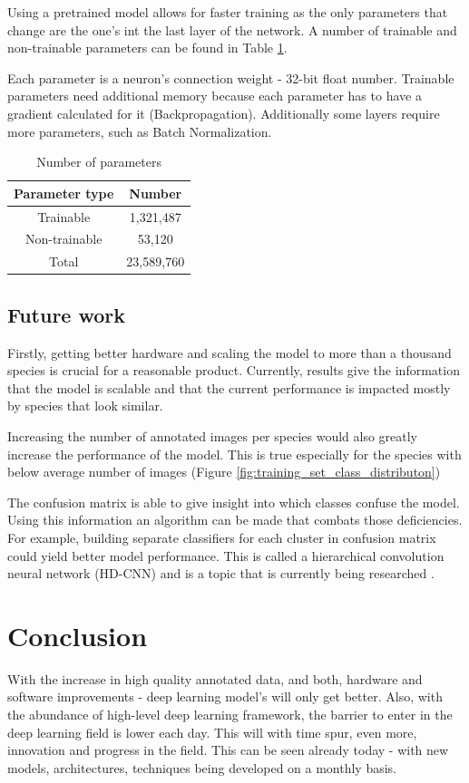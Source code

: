 \documentclass[times, utf8, diplomski]{fer}
\begin{document}
Using a pretrained model allows for faster training as the only parameters that change are the one's int the last layer of the network. A number of trainable and non-trainable parameters can be found in Table \ref{tb:model_params}.

Each parameter is a neuron's connection weight - 32-bit float number. Trainable parameters need additional memory because each parameter has to have a gradient calculated for it (Backpropagation). Additionally some layers require more parameters, such as Batch Normalization. 

\begin{table}
\centering
\caption{Number of parameters}
\label{tb:model_params}
\begin{tabular}{cc}
\hline 
Parameter type & Number \\ \hline 
Trainable &   1,321,487\\ 
Non-trainable & 53,120 \\ 
Total & 23,589,760 \\
\hline 
\end{tabular} 
\end{table}

\section{Future work}
\label{se:future_work}

Firstly, getting better hardware and scaling the model to more than a thousand species is crucial for a reasonable product. Currently, results give the information that the model is scalable and that the current performance is impacted mostly by species that look similar. 

Increasing the number of annotated images per species would also greatly increase the performance of the model. This is true especially for the species with below average number of images (Figure \ref{fig:training_set_class_distributon})

The confusion matrix is able to give insight into which classes confuse the model. Using this information an algorithm can be made that combats those deficiencies. For example, building separate classifiers for each cluster in confusion matrix could yield better model performance. This is called a hierarchical convolution neural network (HD-CNN) and is a topic that is currently being researched \citep{yan_hd-cnn:_2015, yan_hd-cnn:_2015-1}. 

\chapter{Conclusion}
With the increase in high quality annotated data, and both, hardware and software improvements - deep learning model's will only get better. Also, with the abundance of high-level deep learning framework, the barrier to enter in the deep learning field is lower each day. This will with time spur, even more, innovation and progress in the field. This can be seen already today - with new models, architectures, techniques being developed on a monthly basis.
\end{document}
